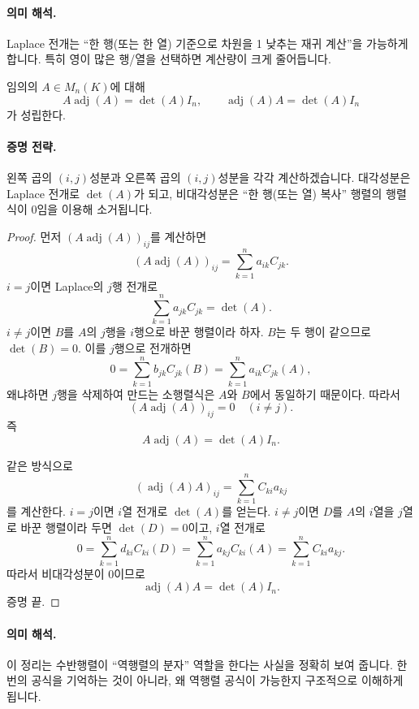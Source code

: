 \paragraph{의미 해석.}
Laplace 전개는 ``한 행(또는 한 열) 기준으로 차원을 1 낮추는 재귀 계산''을 가능하게 합니다. 특히 영이 많은 행/열을 선택하면 계산량이 크게 줄어듭니다.

\begin{theorem}
임의의 $A\in M_n(K)$에 대해
$$
A\operatorname{adj}(A)=\det(A)I_n,
\qquad
\operatorname{adj}(A)A=\det(A)I_n
$$
가 성립한다.
\end{theorem}

\paragraph{증명 전략.}
왼쪽 곱의 $(i,j)$성분과 오른쪽 곱의 $(i,j)$성분을 각각 계산하겠습니다. 대각성분은 Laplace 전개로 $\det(A)$가 되고, 비대각성분은 ``한 행(또는 열) 복사'' 행렬의 행렬식이 $0$임을 이용해 소거됩니다.

\begin{proof}
먼저 $(A\operatorname{adj}(A))_{ij}$를 계산하면
$$
(A\operatorname{adj}(A))_{ij}
=\sum_{k=1}^n a_{ik}C_{jk}.
$$
$i=j$이면 Laplace의 $j$행 전개로
$$
\sum_{k=1}^n a_{jk}C_{jk}=\det(A).
$$
$i\ne j$이면 $B$를 $A$의 $j$행을 $i$행으로 바꾼 행렬이라 하자. $B$는 두 행이 같으므로 $\det(B)=0$. 이를 $j$행으로 전개하면
$$
0=\sum_{k=1}^n b_{jk}C_{jk}(B)
=\sum_{k=1}^n a_{ik}C_{jk}(A),
$$
왜냐하면 $j$행을 삭제하여 만드는 소행렬식은 $A$와 $B$에서 동일하기 때문이다. 따라서
$$
(A\operatorname{adj}(A))_{ij}=0\quad(i\ne j).
$$
즉
$$
A\operatorname{adj}(A)=\det(A)I_n.
$$

같은 방식으로
$$
(\operatorname{adj}(A)A)_{ij}
=\sum_{k=1}^n C_{ki}a_{kj}
$$
를 계산한다. $i=j$이면 $i$열 전개로 $\det(A)$를 얻는다. $i\ne j$이면 $D$를 $A$의 $i$열을 $j$열로 바꾼 행렬이라 두면 $\det(D)=0$이고, $i$열 전개로
$$
0=\sum_{k=1}^n d_{ki}C_{ki}(D)
=\sum_{k=1}^n a_{kj}C_{ki}(A)
=\sum_{k=1}^n C_{ki}a_{kj}.
$$
따라서 비대각성분이 0이므로
$$
\operatorname{adj}(A)A=\det(A)I_n.
$$
증명 끝.
\end{proof}

\paragraph{의미 해석.}
이 정리는 수반행렬이 ``역행렬의 분자'' 역할을 한다는 사실을 정확히 보여 줍니다. 한 번의 공식을 기억하는 것이 아니라, 왜 역행렬 공식이 가능한지 구조적으로 이해하게 됩니다.

